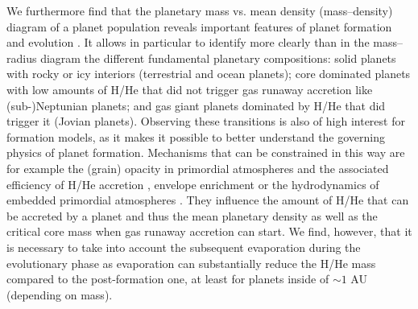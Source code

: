 \documentclass[]{emulateapj}
\begin{document}
We furthermore find that the planetary mass vs. mean density (mass--density) diagram of a planet population reveals important features of planet formation and evolution \citep{Rauer2013,HatzesRauer2015,Baruteau2016}. It allows in particular to identify more clearly than in the mass--radius diagram the different fundamental planetary compositions: solid planets with rocky or icy interiors (terrestrial and ocean planets); core dominated planets with low amounts of H/He that did not trigger gas runaway accretion like (sub-)Neptunian planets; and gas giant planets dominated by H/He that did trigger it (Jovian planets). Observing these transitions is also of high interest for formation models, as it makes it possible to better understand the governing physics of planet formation. Mechanisms that can be constrained in this way are for example the (grain) opacity in primordial atmospheres and the associated efficiency of H/He accretion \citep{Podolak2003,Ormel2014,Mordasini2014}, envelope enrichment \citep{Venturini2016} or  the hydrodynamics of embedded primordial atmospheres \citep{Ormel2015}. They influence the amount of H/He that can be accreted  by a planet and thus the mean planetary density as well as the critical core mass when gas runaway accretion can start. We find, however, that it is necessary to take into account the subsequent evaporation during the evolutionary phase as evaporation can substantially reduce the H/He mass compared to the post-formation one, at least for planets inside of $\sim1$ AU (depending on mass).
\end{document}
